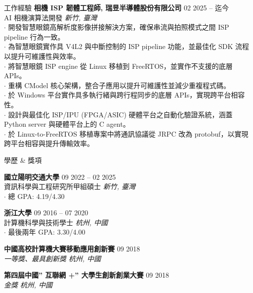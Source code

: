 \documentclass{resume}
\begin{document}
\vspace{-1em}
\begin{rSection}{工作經驗}
    {\bf 相機 ISP 韌體工程師, 瑞昱半導體股份有限公司} \hfill {02 2025 -- 迄今}\\
    {AI 相機演算法開發} \hfill \textit{新竹, 臺灣}\\
    $\cdot$ 開發智慧眼鏡高解析度影像拼接解決方案，確保串流與拍照模式之間 ISP pipeline 行為一致。\\
    $\cdot$ 為智慧眼鏡實作具 V4L2 與中斷控制的 ISP pipeline 功能，並最佳化 SDK 流程以提升可維護性與效率。\\
    $\cdot$ 將智慧眼鏡 ISP engine 從 Linux 移植到 FreeRTOS，並實作不支援的底層 APIs。\\
    $\cdot$ 重構 CModel 核心架構，整合子應用以提升可維護性並減少重複程式碼。\\
    $\cdot$ 於 Windows 平台實作具多執行緒與跨行程同步的底層 APIs，實現跨平台相容性。\\
    $\cdot$ 設計與最佳化 ISP/IPU (FPGA/ASIC) 硬體平台之自動化驗證系統，涵蓋 Python server 與硬體平台上的 C agent。\\
    $\cdot$ 於 Linux-to-FreeRTOS 移植專案中將通訊協議從 JRPC 改為 protobuf，以實現跨平台相容與提升傳輸效率。
\end{rSection}

\vspace{-1em}
\begin{rSection}{學歷 \& 獎項}

{\bf 國立陽明交通大學} \hfill {09 2022 -- 02 2025}\\
資訊科學與工程研究所甲組碩士 \hfill \textit{新竹, 臺灣}\\
$\cdot$ 總 GPA: 4.19/4.30

{\bf 浙江大學} \hfill {09 2016 -- 07 2020}\\
計算機科學與技術學士 \hfill \textit{杭州, 中國}\\
$\cdot$ 最後兩年 GPA: 3.30/4.00

{\bf 中國高校計算機大賽移動應用創新賽} \hfill {09 2018}\\
{\textit{一等獎、最具創新獎}} \hfill \textit{杭州, 中國}

{\bf 第四屆中國” 互聯網 +” 大學生創新創業大賽} \hfill {09 2018}\\
{\textit{金獎}} \hfill \textit{杭州, 中國}

\end{rSection}
\end{document}
